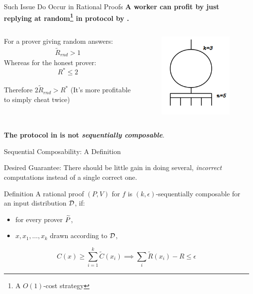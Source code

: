 \begin{frame}[t]{Such Issue Do Occur in Rational Proofs}
\large{\textbf{A worker can profit by just replying at random\footnote{A $O(1)$-cost strategy} in protocol by \cite{am1}.}}
\medskip
\begin{columns}
	For a prover giving random answers:
	\onslide<2->
	\begin{align*}
	\tilde{R}_{rnd} > 1
	\end{align*}
	\onslide<3->
	Whereas for the honest prover:
	\[
	R^* \leq 2
	\]\\
	\medskip
	\onslide<4->
Therefore $2\tilde{R}_{rnd} > R^*$
{(It's more profitable to simply cheat twice)}
	\onslide<1->
	\begin{figure}
		\includegraphics[scale=0.7]{pics/threshold-circ.png}
		
	\end{figure}
\end{columns}
\medskip
	 \textbf{The protocol in \cite{am1} is not \textit{sequentially composable}}.
	\vfill
\end{frame}

\begin{frame}{Sequential Composability: A Definition}

\begin{framed}
\begin{block}{Desired Guarantee:}
	There should be little gain in doing several, \textit{incorrect} computations instead of a single correct one.
\end{block}
\end{framed}
	\bigskip
\pause
	\begin{block}{Definition}
		A rational proof $(P,V)$ for $f$ 
		is $(k,\epsilon)$-{\sf sequentially composable} for an input distribution $\cal D$, if:
			\pause
		\begin{itemize}
			\item  for every prover $\widetilde{P}$, 
				\pause
			\item	$x,x_1,\ldots,x_k$ drawn according to ${\cal D}$,
		\end{itemize}
				\pause
		$$C(x) \geq \sum_{i=1}^k 
		\tilde{C}(x_i)\implies \sum_{i}\tilde{R}(x_i) - R \leq \epsilon$$
	\end{block}
\end{frame}


